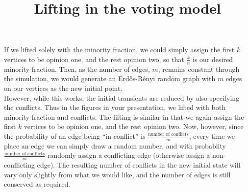 \documentclass[11pt]{article}
\begin{document}
\title{\vspace{-10mm}Lifting in the voting model}
\author{}
\date{}
\maketitle

If we lifted solely with the minority fraction, we could simply assign the first $k$ vertices to be opinion one, and the rest opinion two, so that $\frac{k}{n}$ is our desired minority fraction. Then, as the number of edges, $m$, remains constant through the simulation, we would generate an Erd\H{o}s-R\'{e}nyi random graph with $m$ edges on our vertices as the new initial point.  \\

However, while this works, the initial transients are reduced by also specifying the conflicts. Thus in the figures in your presentation, we lifted with both minority fraction and conflicts. The lifting is similar in that we again assign the first $k$ vertices to be opinion one, and the rest opinion two. Now, however, since the probability of an edge being ``in conflict'' is $\frac{\textrm{number of conflicts}}{m}$, every time we place an edge we can simply draw a random number, and with probablity $\frac{\textrm{number of conflicts}}{m}$ randomly assign a conflicting edge (otherwise assign a non-conflicting edge). The resulting number of conflicts in the new initial state will vary only slightly from what we would like, and the number of edges is still conserved as required.
\end{document}
